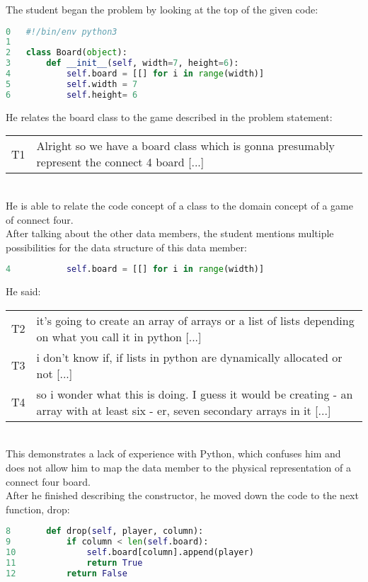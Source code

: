 The student began the problem by looking at the top of the given code:
\begin{lstlisting}[language=python]
0 	#!/bin/env python3
1
2 	class Board(object):
3 		def __init__(self, width=7, height=6):
4 			self.board = [[] for i in range(width)]
5 			self.width = 7
6 			self.height= 6
\end{lstlisting}

He relates the board class to the game described in the problem statement: \\
\begin{tabular}{lp{13cm}}
T1& Alright so we have a board class which is gonna presumably represent the connect 4 board [...]\\
\end{tabular} \\
He is able to relate the code concept of a class to the domain concept of a game of connect four. \\

After talking about the other data members, the student mentions multiple possibilities for the data structure of this data member:
\begin{lstlisting}[language=python]
4 			self.board = [[] for i in range(width)]
\end{lstlisting}

He said: \\
\begin{tabular}{lp{13cm}}
T2& it's going to create an array of arrays or a list of lists depending on what you call it in python [...] \\
T3& i don't know if, if lists in python are dynamically allocated or not [...] \\
T4& so i wonder what this is doing. I guess it would be creating - an array with at least six - er, seven secondary arrays in it [...]\\
\end{tabular}\\
This demonstrates a lack of experience with Python, which confuses him and does not allow him to map the data member to the physical representation of a connect four board. \\


After he finished describing the constructor, he moved down the code to the next function, drop:
\begin{lstlisting}[language=python]
8 		def drop(self, player, column):
9 			if column < len(self.board):
10				self.board[column].append(player)
11				return True
12			return False
\end{lstlisting} 


